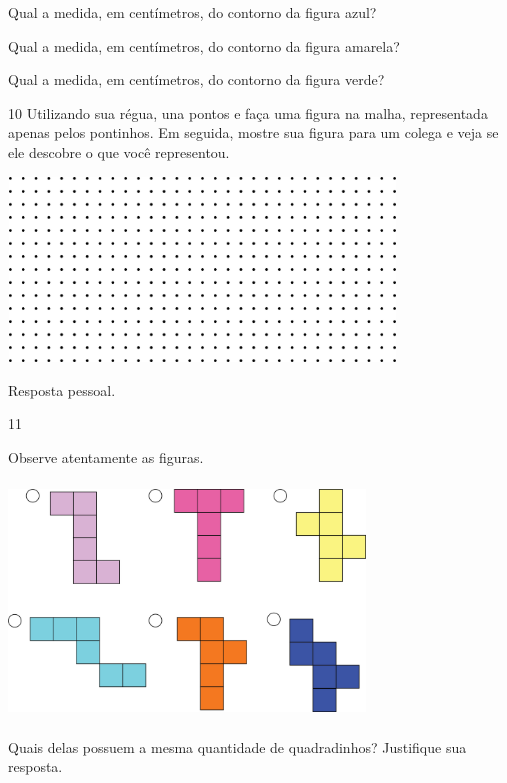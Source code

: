 \begin{multicols}{2}
\begin{escolha}
\item
  Qual a medida, em centímetros, do contorno da figura azul?
\coment{18 cm}

\item
  Qual a medida, em centímetros, do contorno da figura amarela?
\coment{12 cm}

\item
  Qual a medida, em centímetros, do contorno da figura verde?
\coment{22 cm}

\end{escolha}

\num{10} Utilizando sua régua, una pontos e faça uma figura na malha, representada apenas pelos pontinhos. Em seguida, mostre sua
figura para um colega e veja se ele descobre o que você representou.


\includegraphics[width=4.05869in,height=1.93350in]{media/image58.png}

Resposta pessoal.

\num{11}

Observe atentamente as figuras.


\includegraphics[width=3.72532in,height=2.47521in]{media/image59.png}

Quais delas possuem a mesma quantidade de quadradinhos? Justifique sua resposta.


\end{multicols}
